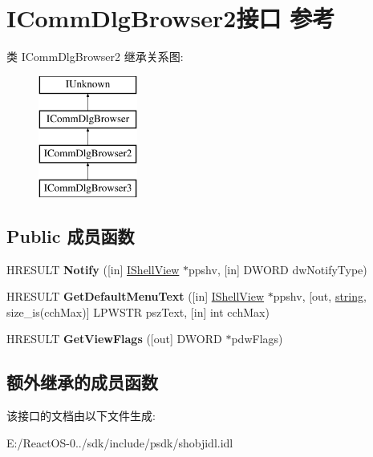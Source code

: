 \hypertarget{interface_i_comm_dlg_browser2}{}\section{I\+Comm\+Dlg\+Browser2接口 参考}
\label{interface_i_comm_dlg_browser2}
类 I\+Comm\+Dlg\+Browser2 继承关系图\+:\begin{figure}[H]
\begin{center}
\leavevmode
\includegraphics[height=4.000000cm]{interface_i_comm_dlg_browser2}
\end{center}
\end{figure}
\subsection*{Public 成员函数}
\begin{DoxyCompactItemize}
\item 
\mbox{\label{interface_i_comm_dlg_browser2_a3e492f4120a4e991a4a76622af6064b7}} 
H\+R\+E\+S\+U\+LT {\bfseries Notify} (\mbox{[}in\mbox{]} \hyperlink{interface_i_shell_view}{I\+Shell\+View} $\ast$ppshv, \mbox{[}in\mbox{]} D\+W\+O\+RD dw\+Notify\+Type)
\item 
\mbox{\label{interface_i_comm_dlg_browser2_ac28699cea447771248079aa6698c96d2}} 
H\+R\+E\+S\+U\+LT {\bfseries Get\+Default\+Menu\+Text} (\mbox{[}in\mbox{]} \hyperlink{interface_i_shell_view}{I\+Shell\+View} $\ast$ppshv, \mbox{[}out, \hyperlink{structstring}{string}, size\+\_\+is(cch\+Max)\mbox{]} L\+P\+W\+S\+TR psz\+Text, \mbox{[}in\mbox{]} int cch\+Max)
\item 
\mbox{\label{interface_i_comm_dlg_browser2_a5710508cf29e44b1c0a2baadbb8a406e}} 
H\+R\+E\+S\+U\+LT {\bfseries Get\+View\+Flags} (\mbox{[}out\mbox{]} D\+W\+O\+RD $\ast$pdw\+Flags)
\end{DoxyCompactItemize}
\subsection*{额外继承的成员函数}


该接口的文档由以下文件生成\+:\begin{DoxyCompactItemize}
\item 
E\+:/\+React\+O\+S-\/0../sdk/include/psdk/shobjidl.\+idl\end{DoxyCompactItemize}
